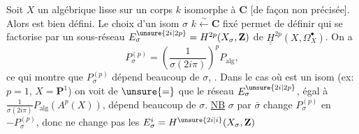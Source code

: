 Soit $X$ un  algébrique lisse sur  un corps $k$ isomorphe à $\mathbf C$ [de façon non précisée]. Alors
est bien défini. Le choix d'un isom $\sigma$ $k\xleftarrow{\sim}\mathbf C$ fixé permet de définir
qui se factorise par un sous-réseau $E_\sigma^{\unsure{2i|2p}}=H^{2p}(X_\sigma,\mathbf Z)$ de $\underline{\underline H}^{2p}(X,\Omega_X^\bullet)$. On a
\[
 P_\sigma^{(p)}=\left(\frac{1}{\sigma(2i\pi)}\right)^p P_{\mathrm{alg}},
\]
ce qui montre que $P_\sigma^{(p)}$ dépend beaucoup de $\sigma$, . Dans le cas où
est un isom (ex: $p=1$, $X=\mathbf P^1$) on voit de $\unsure{=}$ que le réseau $E_\sigma^{\unsure{2i|2p}}$, égal à $\displaystyle\frac{1}{\sigma(2i\pi)}P_{\mathrm{alg}}(A^p(X))$, dépend beaucoup de $\sigma$. \uline{NB}  $\sigma$ par $\bar\sigma$ change $P_\sigma^{(p)}$ en $-P_\sigma^{(p)}$, donc ne change pas les $E_\sigma^i=H^{\unsure{2i|i}}(X_\sigma,\mathbf Z)$

